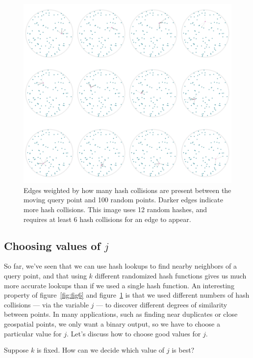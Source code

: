 \documentclass[20pt,]{extarticle}
\begin{document}
\begin{figure}
\centering
\includegraphics{images/image8b_fixed.png}
\caption{Edges weighted by how many hash collisions are present between
the moving query point and 100 random points. Darker edges indicate more
hash collisions. This image uses 12 random hashes, and requires at least
6 hash collisions for an edge to appear.}\label{fig:fig8b}
\end{figure}

\subsection{\texorpdfstring{Choosing values of
\(j\)}{Choosing values of j}}\label{choosing-values-of-j}

So far, we've seen that we can use hash lookups to find nearby neighbors
of a query point, and that using \(k\) different randomized hash
functions gives us much more accurate lookups than if we used a single
hash function. An interesting property of figure~\ref{fig:fig6} and
figure~\ref{fig:fig8b} is that we used different numbers of hash
collisions --- via the variable \(j\) --- to discover different degrees
of similarity between points. In many applications, such as finding near
duplicates or close geospatial points, we only want a binary output, so
we have to choose a particular value for \(j\). Let's discuss how to
choose good values for \(j.\)

Suppose \(k\) is fixed. How can we decide which value of \(j\) is best?
\end{document}

